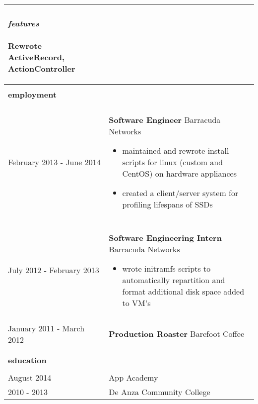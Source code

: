 \documentclass{article}
\begin{document}
\begin{tabular}{L{3cm} R{13.5cm}}
    \paragraph{\textit{features}}{
        Rewrote ActiveRecord, ActionController
    }

    \\ \hline \\

    \Large{\textbf{employment}} \\\\
    \normalsize

    February 2013 - June 2014
    
    &

    \textbf{Software Engineer}
    Barracuda Networks

    \begin{itemize}
        \item maintained and rewrote install scripts for linux (custom
            and CentOS) on hardware appliances
        \item created a client/server system for profiling lifespans of
            SSDs
    \end{itemize}

    \\\\
    
    July 2012 - February 2013
    &
    \textbf{Software Engineering Intern}
    Barracuda Networks

    \begin{itemize}
        \item wrote initramfs scripts to automatically repartition and 
            format additional disk space added to VM's
    \end{itemize}

    \\\\
    
    January 2011 - March 2012
    &
    \textbf{Production Roaster}
    Barefoot Coffee
    
    \\\\ \hline \\

    \Large{\textbf{education}} \\\\
    \normalsize

    August 2014 & App Academy \\

    2010 - 2013 & De Anza Community College \\
\end{tabular}
\end{document}
